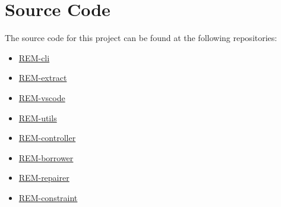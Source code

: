 \section*{Source Code}

The source code for this project can be found at the following repositories:
\begin{itemize}
    \item \href{https://github.com/RuleBrittonica/rem-cli}{REM-cli}
    \item \href{https://github.com/RuleBrittonica/rem-extract}{REM-extract}
    \item \href{https://github.com/RuleBrittonica/rem-vscode}{REM-vscode}
    \item \href{https://github.com/RuleBrittonica/rem-utils}{REM-utils}
    \item \href{https://github.com/RuleBrittonica/rem-controller}{REM-controller}
    \item \href{https://github.com/RuleBrittonica/rem-borrower}{REM-borrower}
    \item \href{https://github.com/RuleBrittonica/rem-repairer}{REM-repairer}
    \item \href{https://github.com/RuleBrittonica/rem-constraint}{REM-constraint}
\end{itemize}